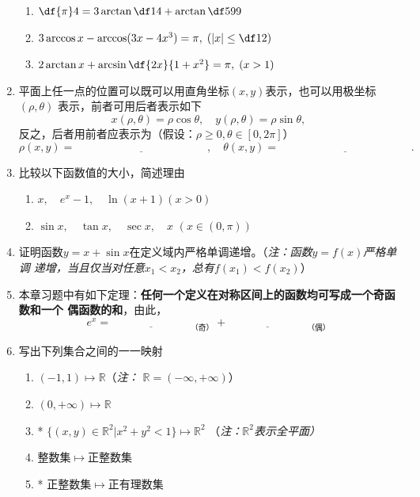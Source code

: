 \begin{enumerate}
  \begin{enumerate}[(1)]
    \item $\df{\pi}4=3\arctan\df14+\arctan\df5{99}$
    \item $3\arccos x-\arccos(3x-4x^3)=\pi,\;\left(|x|\leq\df12\right)$
    \item $2\arctan x+\arcsin\df{2x}{1+x^2}=\pi,\;(x>1)$
  \end{enumerate}
  \item 平面上任一点的位置可以既可以用直角坐标$(x,y)$表示，也可以用极坐标$(\rho,\theta)$
  表示，前者可用后者表示如下
  $$x(\rho,\theta)=\rho\cos\theta,\quad y(\rho,\theta)=\rho\sin\theta,$$
  反之，后者用前者应表示为（假设：$\rho\geq 0,\theta\in[0,2\pi]$）
  $$\rho(x,y)=\underline{\hspace{5cm}},\quad
  \theta(x,y)=\underline{\hspace{5cm}}.$$
  \item 比较以下函数值的大小，简述理由
  \begin{enumerate}[(1)]
    \item $x,\quad e^x-1,\quad \ln(x+1)$\quad$(x>0)$
    \item $\sin x,\quad \tan x, \quad \sec x, \quad x$ \quad $(x\in(0,\pi))$
  \end{enumerate}
  \item 证明函数$y=x+\sin x$在定义域内严格单调递增。（{\it 注：函数$y=f(x)$严格单调
  递增，当且仅当对任意$x_1<x_2$，总有$f(x_1)<f(x_2)$}）
  \item 本章习题中有如下定理：{\bf 任何一个定义在对称区间上的函数均可写成一个奇函数和一个
  偶函数的和}，由此，
  $$e^x=\underline{\hspace{3cm}}_{\mbox{（奇）}}
  +\underline{\hspace{3cm}}_{\mbox{（偶）}}$$
  \item 写出下列集合之间的一一映射
  \begin{enumerate}[(1)]
    \item $(-1,1)\mapsto\mathbb{R}$\hspace{2cm}（{\it 注：
  $\mathbb{R}=(-\infty,+\infty)$}）
    \item $(0,+\infty)\mapsto\mathbb{R}$
    \item* $\{(x,y)\in\mathbb{R}^2|x^2+y^2<1\}\mapsto\mathbb{R}^2$
    \hspace{2cm}（{\it 注：$\mathbb{R}^2$表示全平面）}
    \item 整数集$\mapsto$正整数集
    \item* 正整数集$\mapsto$正有理数集
  \end{enumerate}

\end{enumerate}
